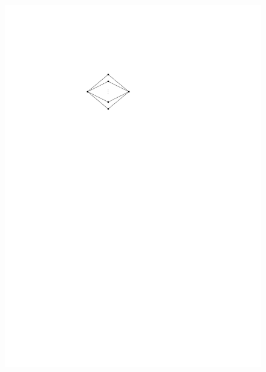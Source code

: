 \documentclass[runningheads]{llncs}
\begin{document}
\begin{figure}[htpb]
\centering
\includegraphics[scale=1]{img/K_2_l}

\end{figure}
\end{document}
